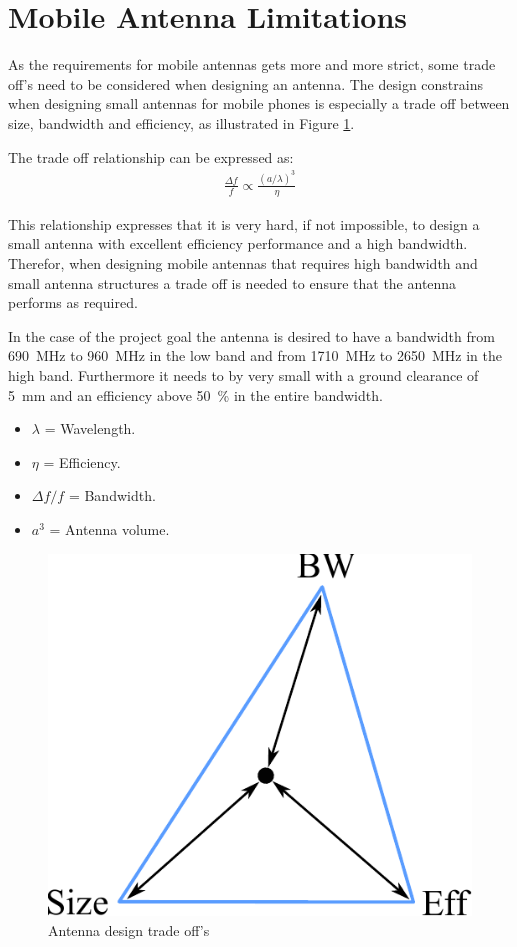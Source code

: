 \section{Mobile Antenna Limitations}
As the requirements for mobile antennas gets more and more strict, some trade off's need to be considered when designing an antenna.
The design constrains when designing small antennas for mobile phones is especially a trade off between size, bandwidth and efficiency, as illustrated in Figure \ref{fig:antenna_tradeoff}. 

The trade off relationship can be expressed as: 
\begin{align*}
  \frac{\Delta f}{f} \propto \frac{(a/ \lambda)^3}{\eta}
\end{align*}

This relationship expresses that it is very hard, if not impossible, to design a small antenna with excellent efficiency performance and a high bandwidth.
Therefor, when designing mobile antennas that requires high bandwidth and small antenna structures a trade off is needed to ensure that the antenna performs as required.

In the case of the project goal the antenna is desired to have a bandwidth from \SI{690}{MHz} to \SI{960}{MHz} in the low band and from \SI{1710}{MHz} to \SI{2650}{MHz} in the high band. Furthermore it needs to by very small with a ground clearance of \SI{5}{mm} and an efficiency above \SI{50}{\percent} in the entire bandwidth.

\begin{itemize}
\item $\lambda$ = Wavelength.
\item $\eta$ = Efficiency.
\item $\Delta f / f$ = Bandwidth.
\item $a^3$ = Antenna volume.
\end{itemize}

\begin{figure}[htbp]
  \centering
  \includegraphics[scale=0.4]{img/analysis/antenna_limitations}
  \caption{Antenna design trade off's}
  \label{fig:antenna_tradeoff}
\end{figure}

\cite{hilbert2015tradeoff}